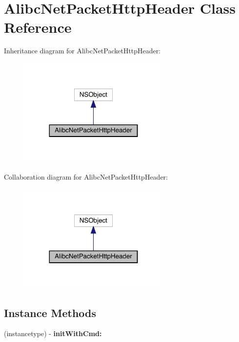 \hypertarget{interface_alibc_net_packet_http_header}{}\section{Alibc\+Net\+Packet\+Http\+Header Class Reference}
\label{interface_alibc_net_packet_http_header}


Inheritance diagram for Alibc\+Net\+Packet\+Http\+Header\+:\nopagebreak
\begin{figure}[H]
\begin{center}
\leavevmode
\includegraphics[width=215pt]{interface_alibc_net_packet_http_header__inherit__graph}
\end{center}
\end{figure}


Collaboration diagram for Alibc\+Net\+Packet\+Http\+Header\+:\nopagebreak
\begin{figure}[H]
\begin{center}
\leavevmode
\includegraphics[width=215pt]{interface_alibc_net_packet_http_header__coll__graph}
\end{center}
\end{figure}
\subsection*{Instance Methods}
\begin{DoxyCompactItemize}
\item 
\mbox{\label{interface_alibc_net_packet_http_header_aad02a467297580fb41550b9144ee53f6}} 
(instancetype) -\/ {\bfseries init\+With\+Cmd\+:}
\end{DoxyCompactItemize}
